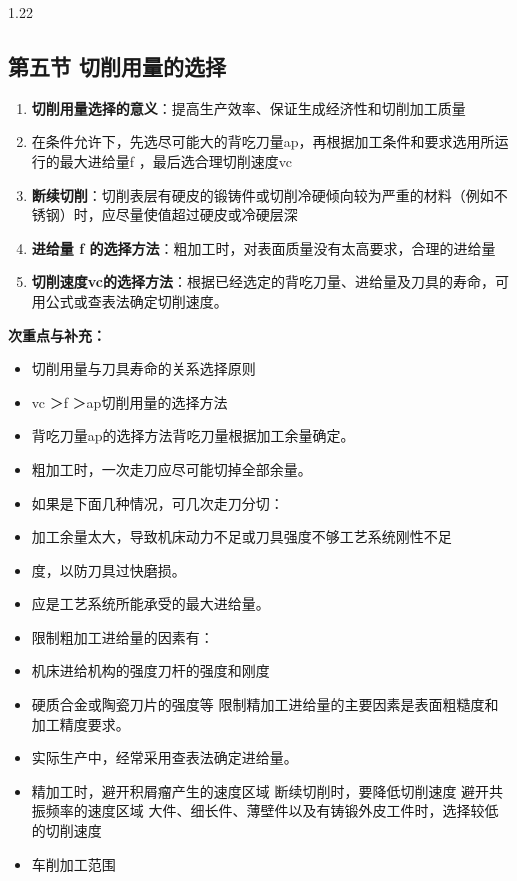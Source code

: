 \documentclass[12pt,a4paper]{article}
\begin{document}
\begin{spacing}{1.22}
\subsection{第五节 切削用量的选择}
\begin{tcolorbox}[colback=yellow!6,colframe=red!55!black,title=重点,left=1mm,right=1mm]
\begin{enumerate}[leftmargin=2.2em,label=\arabic*.]
  \item \textbf{切削用量选择的意义}：提高生产效率、保证生成经济性和切削加工质量
  \item 在条件允许下，先选尽可能大的背吃刀量ap，再根据加工条件和要求选用所运行的最大进给量f ，最后选合理切削速度vc
  \item \textbf{断续切削}：切削表层有硬皮的锻铸件或切削冷硬倾向较为严重的材料（例如不锈钢）时，应尽量使值超过硬皮或冷硬层深
  \item \textbf{进给量 f 的选择方法}：粗加工时，对表面质量没有太高要求，合理的进给量
  \item \textbf{切削速度vc的选择方法}：根据已经选定的背吃刀量、进给量及刀具的寿命，可用公式或查表法确定切削速度。
\end{enumerate}
\end{tcolorbox}
\noindent\textbf{次重点与补充：}
\begin{itemize}[leftmargin=2.2em,label=--]
  \item 切削用量与刀具寿命的关系选择原则
  \item vc ＞f ＞ap切削用量的选择方法
  \item 背吃刀量ap的选择方法背吃刀量根据加工余量确定。
  \item 粗加工时，一次走刀应尽可能切掉全部余量。
  \item 如果是下面几种情况，可几次走刀分切：
  \item 加工余量太大，导致机床动力不足或刀具强度不够工艺系统刚性不足
  \item 度，以防刀具过快磨损。
  \item 应是工艺系统所能承受的最大进给量。
  \item 限制粗加工进给量的因素有：
  \item 机床进给机构的强度刀杆的强度和刚度
  \item 硬质合金或陶瓷刀片的强度等 限制精加工进给量的主要因素是表面粗糙度和加工精度要求。
  \item 实际生产中，经常采用查表法确定进给量。
  \item 精加工时，避开积屑瘤产生的速度区域 断续切削时，要降低切削速度 避开共振频率的速度区域 大件、细长件、薄壁件以及有铸锻外皮工件时，选择较低的切削速度
  \item 车削加工范围
\end{itemize}


\end{spacing}
\end{document}
